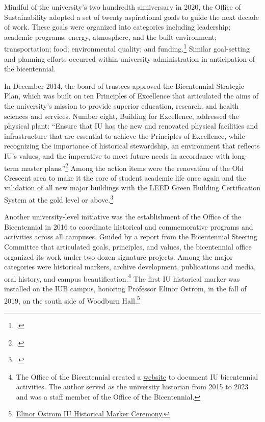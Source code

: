 \documentclass[
  american,
  letterpaper,
]{scrreprt}
\begin{document}
Mindful of the university's two hundredth anniversary in 2020, the
Office of Sustainability adopted a set of twenty aspirational goals to
guide the next decade of work. These goals were organized into
categories including leadership; academic programs; energy, atmosphere,
and the built environment; transportation; food; environmental quality;
and funding.\footnote{.}
Similar goal-setting and planning efforts occurred within university
administration in anticipation of the bicentennial.

In December 2014, the board of trustees approved the Bicentennial
Strategic Plan, which was built on ten Principles of Excellence that
articulated the aims of the university's mission to provide superior
education, research, and health sciences and services. Number eight,
Building for Excellence, addressed the physical plant: ``Ensure that IU
has the new and renovated physical facilities and infrastructure that
are essential to achieve the Principles of Excellence, while recognizing
the importance of historical stewardship, an environment that reflects
IU's values, and the imperative to meet future needs in accordance with
long-term master plans.''\footnote{.}
Among the action items were the renovation of the Old Crescent area to
make it the core of student academic life once again and the validation
of all new major buildings with the LEED Green Building Certification
System at the gold level or above.\footnote{.}

Another university-level initiative was the establishment of the Office
of the Bicentennial in 2016 to coordinate historical and commemorative
programs and activities across all campuses. Guided by a report from the
Bicentennial Steering Committee that articulated goals, principles, and
values, the bicentennial office organized its work under two dozen
signature projects. Among the major categories were historical markers,
archive development, publications and media, oral history, and campus
beautification.\footnote{The Office of the Bicentennial created a
  \href{https://web.archive.org/web/20170427181106/https://200.iu.edu/}{website}
  to document IU bicentennial activities. The author served as the
  university historian from 2015 to 2023 and was a staff member of the
  Office of the Bicentennial.} The first IU historical marker was
installed on the IUB campus, honoring Professor Elinor Ostrom, in the
fall of 2019, on the south side of Woodburn Hall.\footnote{\href{https://web.archive.org/web/20210624095353/https://honorsandawards.iu.edu/awards/honoree/1071.html}{Elinor
  Ostrom IU Historical Marker Ceremony.}}
\end{document}
